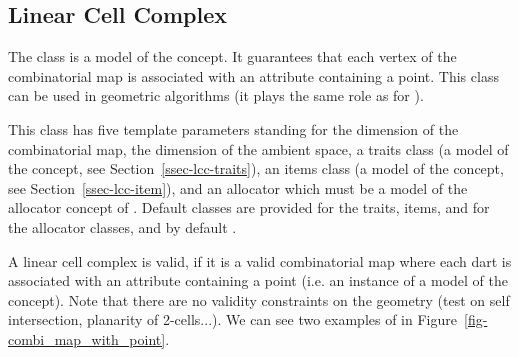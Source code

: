 \subsection{Linear Cell Complex}\label{ssec-linear-cell-complex}

The  class
is a model of the  concept. It guarantees that
each vertex of the combinatorial map is associated with an attribute
containing a point. This class can be used in geometric algorithms (it
plays the same role as  for ).

This class has five template parameters standing for the dimension of
the combinatorial map, the dimension of the ambient space, a traits
class (a model of the  concept, see
Section~\ref{ssec-lcc-traits}), an items class (a model of the
 concept, see
Section~\ref{ssec-lcc-item}), and an allocator which must be a model
of the allocator concept of {\stl}.  Default classes are provided for
the traits, items, and for the allocator classes, and by default
.

A linear cell complex is valid, if it is a valid combinatorial map
where each dart is associated with an attribute containing a point
(i.e.  an instance of a model of the 
concept).  Note that there are no validity constraints on the geometry
(test on self intersection, planarity of 2-cells...).
We can see two examples of  in
Figure~\ref{fig-combi_map_with_point}.

